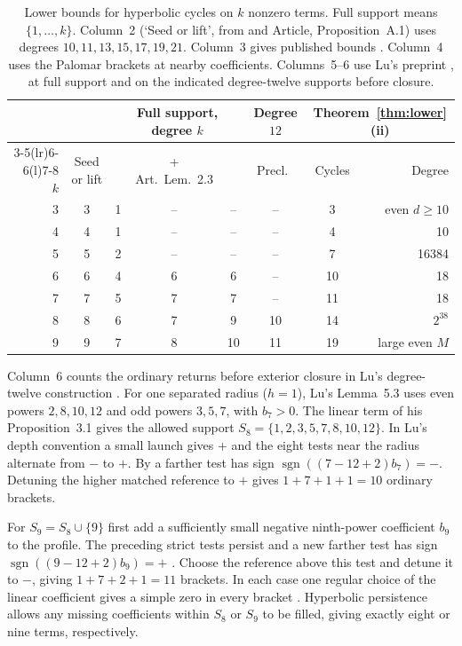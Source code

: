 \begin{table}[htbp]
\centering\small
\setlength{\tabcolsep}{3.5pt}
\caption{Lower bounds for hyperbolic cycles on $k$ nonzero terms. Full
support means $\{1,\ldots,k\}$. Column~2 (`Seed or lift', from
\cite{CJLZ} and Article, Proposition~A.1) uses degrees
$10,11,13,15,17,19,21$. Column~3 gives published bounds
\cite{LMP,LL,DMH}. Column~4 uses the Palomar brackets at nearby
coefficients. Columns~5--6 use Lu's preprint \cite{LuDegree}, at full
support and on the indicated degree-twelve supports before closure.}
\label{tab:low-comparison}
\begin{tabular}{@{}rccccccr@{}}
\toprule
 & & \multicolumn{3}{c}{Full support, degree $k$}
 & Degree $12$ & \multicolumn{2}{c}{Theorem~\ref{thm:lower}(ii)}\\
\cmidrule(lr){3-5}\cmidrule(lr){6-6}\cmidrule(l){7-8}
$k$ & Seed or lift & \cite{LMP,LL,DMH} & \cite{Palomar} + Art.\ Lem.~2.3 & \cite{LuDegree}
    & Precl.\ \cite{LuDegree} & Cycles & Degree\\
\midrule
3 & 3 & 1 & -- & -- & -- & 3 & even $d\ge10$\\
4 & 4 & 1 & -- & -- & -- & 4 & 10\\
5 & 5 & 2 & -- & -- & -- & 7 & 16384\\
6 & 6 & 4 & 6 & 6 & -- & 10 & 18\\
7 & 7 & 5 & 7 & 7 & -- & 11 & 18\\
8 & 8 & 6 & 7 & 9 & 10 & 14 & $2^{38}$\\
9 & 9 & 7 & 8 & 10 & 11 & 19 & large even $M$\\
\bottomrule
\end{tabular}
\end{table}

Column~6 counts the ordinary returns before exterior closure in
Lu's degree-twelve construction \cite[\S\S5.2--5.3]{LuDegree}.
For one separated radius
($h=1$), Lu's Lemma~5.3 uses even powers $2,8,10,12$ and odd powers
$3,5,7$, with $b_7>0$. The linear term of his Proposition~3.1 gives the
allowed support $S_8=\{1,2,3,5,7,8,10,12\}$. In Lu's depth convention a
small launch gives $+$ and the eight tests near the radius alternate
from $-$ to $+$. By \cite[(3.8)]{LuDegree} a farther test has sign
$\operatorname{sgn}((7-12+2)b_7)=-$. Detuning the higher matched
reference to $+$ gives $1+7+1+1=10$ ordinary brackets.

For $S_9=S_8\cup\{9\}$ first add a sufficiently small negative
ninth-power coefficient $b_9$ to the profile. The preceding strict
tests persist and a new farther test has sign
$\operatorname{sgn}((9-12+2)b_9)=+$ \cite[Lemma~3.2]{LuDegree}.
Choose the reference above this test and detune it to $-$, giving
$1+7+2+1=11$ brackets. In each case one regular choice of the linear
coefficient gives a simple zero in every bracket
\cite[Proposition~2.4(i)]{LuDegree}. Hyperbolic persistence allows
any missing coefficients within $S_8$ or $S_9$ to be filled, giving
exactly eight or nine terms, respectively.

